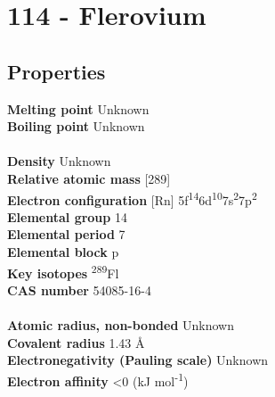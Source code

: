 \section{114 - Flerovium}
\label{sec:elem-flerovium}
\subsection{Properties}
\textbf{Melting point} Unknown\\
\textbf{Boiling point} Unknown\\
\\
\textbf{Density} Unknown\\
\textbf{Relative atomic mass} [289]\\
\textbf{Electron configuration} [Rn] 5f\textsuperscript{14}6d\textsuperscript{10}7s\textsuperscript{2}7p\textsuperscript{2}\\
\textbf{Elemental group} 14\\
\textbf{Elemental period} 7\\
\textbf{Elemental block} p\\
\textbf{Key isotopes} \textsuperscript{289}Fl\\
\textbf{CAS number} 54085-16-4\\
\\
\textbf{Atomic radius, non-bonded} Unknown\\
\textbf{Covalent radius} 1.43 Å\\
\textbf{Electronegativity (Pauling scale)} Unknown\\
\textbf{Electron affinity} <0 (kJ mol\textsuperscript{-1})\\
